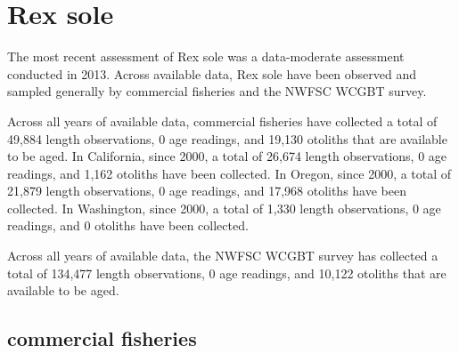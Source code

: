 \documentclass[11pt,
  english,
  letterpaper,
]{article}
\begin{document}
\hypertarget{rex-sole}{%
\section{Rex sole}\label{rex-sole}}

\leavevmode\tagmcend\tagstructend


The most recent assessment of Rex sole was a data-moderate assessment conducted in 2013. Across available data, Rex sole have been observed and sampled generally by commercial fisheries and the NWFSC WCGBT survey.

\leavevmode\tagmcend\tagstructend\par


Across all years of available data, commercial fisheries have collected a total of 49,884 length observations, 0 age readings, and 19,130 otoliths that are available to be aged. In California, since 2000, a total of 26,674 length observations, 0 age readings, and 1,162 otoliths have been collected. In Oregon, since 2000, a total of 21,879 length observations, 0 age readings, and 17,968 otoliths have been collected. In Washington, since 2000, a total of 1,330 length observations, 0 age readings, and 0 otoliths have been collected.

\leavevmode\tagmcend\tagstructend\par


Across all years of available data, the NWFSC WCGBT survey has collected a total of 134,477 length observations, 0 age readings, and 10,122 otoliths that are available to be aged.

\leavevmode\tagmcend\tagstructend\par


\hypertarget{commercial-fisheries-39}{%
\subsection{commercial fisheries}\label{commercial-fisheries-39}}

\leavevmode\tagmcend\tagstructend


\begingroup\fontsize{10}{12}\selectfont \begingroup\fontsize{10}{12}\selectfont
\end{document}

